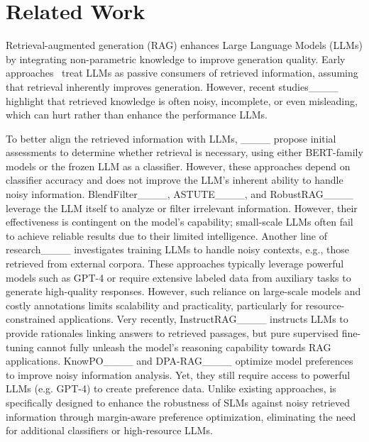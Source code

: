 \section{Related Work}
Retrieval-augmented generation (RAG) enhances Large Language Models (LLMs) by integrating non-parametric knowledge to improve generation quality. 
Early approaches~\cite {izacard2022atlas, shi2023replug} treat LLMs as passive consumers of retrieved information, assuming that retrieval inherently improves generation. However, recent studies____ highlight that retrieved knowledge is often noisy, incomplete, or even misleading, which can hurt rather than enhance the performance LLMs. 


To better align the retrieved information with LLMs, ____ propose initial assessments to determine whether retrieval is necessary, using either BERT-family models or the frozen LLM as a classifier. However, these approaches depend on classifier accuracy and does not improve the LLM’s inherent ability to handle noisy information. BlendFilter____, ASTUTE____, and RobustRAG____ leverage the LLM itself to analyze or filter irrelevant information. However, their effectiveness is contingent on the model’s capability; small-scale LLMs often fail to achieve reliable results due to their limited intelligence. 
Another line of research____ investigates training LLMs to handle noisy contexts, e.g., those retrieved from external corpora. These approaches typically leverage powerful models such as GPT-4 or require extensive labeled data from auxiliary tasks to generate high-quality responses. However, such reliance on large-scale models and costly annotations limits scalability and practicality, particularly for resource-constrained applications. 
Very recently, 
InstructRAG____ instructs LLMs to provide rationales linking answers to retrieved passages, but pure supervised fine-tuning cannot fully unleash the model's reasoning capability towards RAG applications.  
KnowPO____ and DPA-RAG____ optimize model preferences to improve noisy information analysis. Yet, they still require access to powerful LLMs (e.g. GPT-4) to create preference data. 
Unlike existing approaches, {\name} is specifically designed to enhance the robustness of SLMs against noisy retrieved information through margin-aware preference optimization, eliminating the need for additional classifiers or high-resource LLMs.
